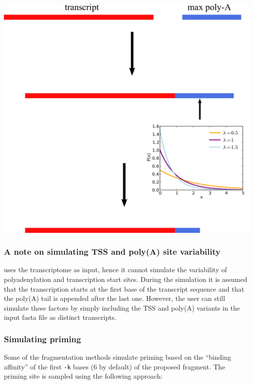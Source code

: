 \begin{center}
\includegraphics[scale=0.6]{pix/polya_simulation.pdf}
\end{center}

\subsubsection{A note on simulating TSS and poly(A) site variability}
\label{sss:tss_pa_varsim}

\rlsim uses the transcriptome as input, hence it cannot simulate the variability of polyadenylation and transcription start sites.
During the simulation it is assumed that the transcription starts at the first base of the transcript sequence and that the poly(A) tail is appended after
the last one. However, the user can still simulate these factors by simply including the TSS and poly(A) variants in the input fasta file as distinct transcripts.

\subsubsection{Simulating priming}
\label{sss:priming_sim}

Some of the fragmentation methods simulate priming based on the ``binding affinity'' of the first \texttt{-k} bases (6 by default) of the proposed fragment. The priming site is sampled using the following approach:

